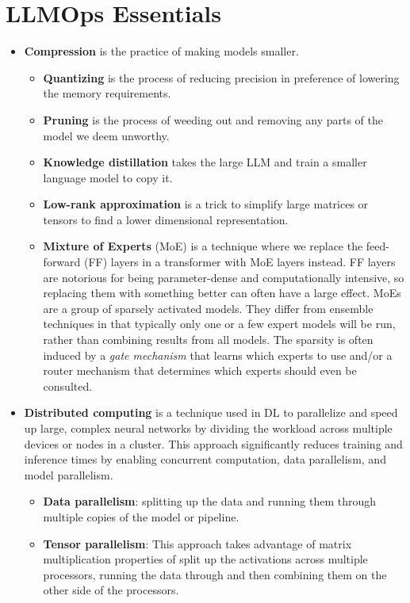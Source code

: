 \section{LLMOps Essentials}
\begin{itemize}
	\item \textbf{Compression} is the practice of making models smaller. 
		\begin{itemize}
			\item \textbf{Quantizing} is the process of reducing precision in preference of lowering the memory requirements. 
			\item \textbf{Pruning} is the process of weeding out and removing any parts of the model we deem unworthy. 
			\item \textbf{Knowledge distillation} takes the large LLM and train a smaller language model to copy it. 
			\item \textbf{Low-rank approximation} is a trick to simplify large matrices or tensors to find a lower dimensional representation. 
			\item \textbf{Mixture of Experts} (MoE) is a technique where we replace the feed-forward (FF) layers in a transformer with MoE layers instead. FF layers are notorious for being parameter-dense and computationally intensive, so replacing them with something better can often have a large effect. MoEs are a group of sparsely activated models. They differ from ensemble techniques in that typically only one or a few expert models will be run, rather than combining results from all models. The sparsity is often induced by a \textit{gate mechanism} that learns which experts to use and/or a router mechanism that determines which experts should even be consulted. 
		\end{itemize}
	\item \textbf{Distributed computing} is a technique used in DL to parallelize and speed up large, complex neural networks by dividing the workload across multiple devices or nodes in a cluster.  This approach significantly reduces training and inference times by enabling concurrent computation, data parallelism, and model parallelism. 
		\begin{itemize}
			\item \textbf{Data parallelism}: splitting up the data and running them through multiple copies of the model or pipeline. 
			\item \textbf{Tensor parallelism}: This approach takes advantage of matrix multiplication properties of split up the activations across multiple processors, running the data through and then combining them on the other side of the processors. 

\end{itemize}
\end{itemize}
